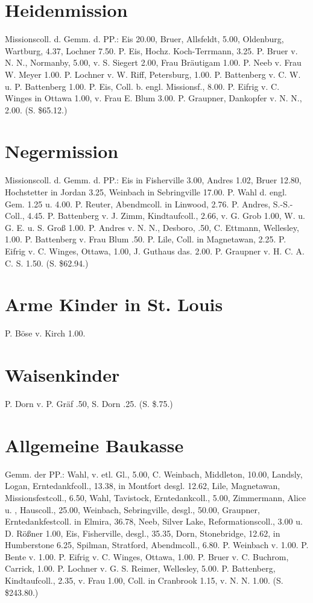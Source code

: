 \section{Heidenmission}

Missionscoll. d. Gemm. d. PP.: Eis 20.00, Bruer, Allsfeldt, 5.00, Oldenburg, Wartburg, 4.37, Lochner 7.50. P. Eis, Hochz. Koch-Terrmann, 3.25. P. Bruer v. N. N., Normanby, 5.00, v. S. Siegert 2.00, Frau Bräutigam 1.00. P. Neeb v. Frau W. Meyer 1.00. P. Lochner v. W. Riff, Petersburg, 1.00. P. Battenberg v. C. W. u. P. Battenberg 1.00. P. Eis, Coll. b. engl. Missionsf., 8.00. P. Eifrig v. C. Winges in Ottawa 1.00, v. Frau E. Blum 3.00. P. Graupner, Dankopfer v. N. N., 2.00. (S. \$65.12.)

\section{Negermission}

Missionscoll. d. Gemm. d. PP.: Eis in Fisherville 3.00, Andres 1.02, Bruer 12.80, Hochstetter in Jordan 3.25, Weinbach in Sebringville 17.00. P. Wahl d. engl. Gem. 1.25 u. 4.00. P. Reuter, Abendmcoll. in Linwood, 2.76. P. Andres, S.-S.-Coll., 4.45. P. Battenberg v. J. Zimm, Kindtaufcoll., 2.66, v. G. Grob 1.00, W. u. G. E. u. S. Groß 1.00. P. Andres v. N. N., Desboro, .50, C. Ettmann, Wellesley, 1.00. P. Battenberg v. Frau Blum .50. P. Lile, Coll. in Magnetawan, 2.25. P. Eifrig v. C. Winges, Ottawa, 1.00, J. Guthaus das. 2.00. P. Graupner v. H. C. A. C. S. 1.50. (S. \$62.94.)

\section{Arme Kinder in St. Louis}

P. Böse v. Kirch 1.00.

\section{Waisenkinder}

P. Dorn v. P. Gräf .50, S. Dorn .25. (S. \$.75.)

\section{Allgemeine Baukasse}

Gemm. der PP.: Wahl, v. etl. Gl., 5.00, C. Weinbach, Middleton, 10.00, Landsly, Logan, Erntedankfcoll., 13.38, in Montfort desgl. 12.62, Lile, Magnetawan, Missionsfestcoll., 6.50, Wahl, Tavistock, Erntedankcoll., 5.00, Zimmermann, Alice u. , Hauscoll., 25.00, Weinbach, Sebringville, desgl., 50.00, Graupner, Erntedankfestcoll. in Elmira, 36.78, Neeb, Silver Lake, Reformationscoll., 3.00 u. D. Rößner 1.00, Eis, Fisherville, desgl., 35.35, Dorn, Stonebridge, 12.62, in Humberstone 6.25, Spilman, Stratford, Abendmcoll., 6.80. P. Weinbach v.  1.00. P. Bente v.  1.00. P. Eifrig v. C. Winges, Ottawa, 1.00. P. Bruer v. C. Buchrom, Carrick, 1.00. P. Lochner v. G. S. Reimer, Wellesley, 5.00. P. Battenberg, Kindtaufcoll., 2.35, v. Frau  1.00, Coll. in Cranbrook 1.15, v. N. N. 1.00. (S. \$243.80.)


